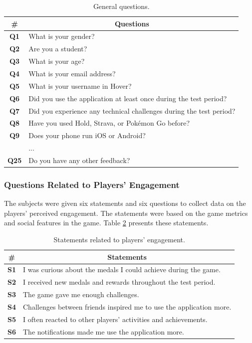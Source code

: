 \begin{table}[H]
    \centering
    \begin{tabularx}{\textwidth}{|c|X|}
        \hline
        \textbf{\#} & \multicolumn{1}{c|}{\textbf{Questions}} \\ \hline
        \textbf{Q1} & What is your gender? \\
        \textbf{Q2} & Are you a student? \\
        \textbf{Q3} & What is your age? \\
        \textbf{Q4} & What is your email address? \\
        \textbf{Q5} & What is your username in Hover? \\
        \textbf{Q6} & Did you use the application at least once during the test period? \\
        \textbf{Q7} & Did you experience any technical challenges during the test period? \\
        \textbf{Q8} & Have you used Hold, Strava, or Pokémon Go before? \\ 
        \textbf{Q9} & Does your phone run iOS or Android? \\ 
        \textbf{} & ...  \\ 
        \textbf{Q25} & Do you have any other feedback?  \\ \hline
    \end{tabularx}
    \caption{General questions.}
    \label{tab:general_questions}
\end{table}

\subsubsection{Questions Related to Players' Engagement}
The subjects were given six statements and six questions to collect data on the players’ perceived engagement. The statements were based on the game metrics and social features in the game. Table \ref{tab:player_engagement_statements} presents these statements.

\begin{table}[H]
    \centering
    \begin{tabularx}{\textwidth}{|c|X|}
        \hline
        \textbf{\#} & \multicolumn{1}{c|}{\textbf{Statements}} \\ \hline
        \textbf{S1} & I was curious about the medals I could achieve during the game. \\
        \textbf{S2} & I received new medals and rewards throughout the test period. \\
        \textbf{S3} & The game gave me enough challenges. \\
        \textbf{S4} & Challenges between friends inspired me to use the application more. \\
        \textbf{S5} & I often reacted to other players' activities and achievements. \\
        \textbf{S6} & The notifications made me use the application more. \\ \hline
    \end{tabularx}
    \caption{Statements related to players' engagement.}
    \label{tab:player_engagement_statements}
\end{table}

